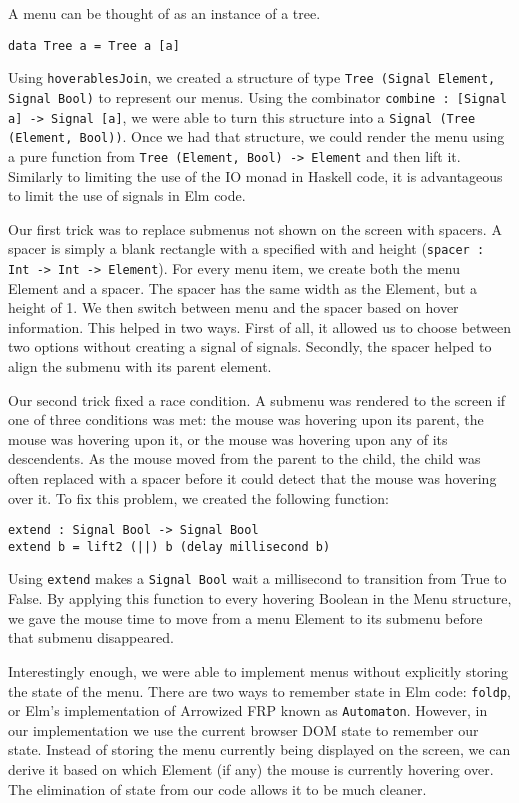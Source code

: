 \documentclass{article}
\begin{document}
A menu can be thought of as an instance of a tree.

\texttt{data Tree a = Tree a [a]}

Using \texttt{hoverablesJoin}, we created a structure of type
\texttt{Tree (Signal Element, Signal Bool)} to represent our menus.
Using the combinator
\texttt{combine : {[}Signal a{]} -\textgreater{} Signal {[}a{]}}, we
were able to turn this structure into a
\texttt{Signal (Tree (Element, Bool))}. Once we had that structure, we
could render the menu using a pure function from
\texttt{Tree (Element, Bool) -\textgreater{} Element} and then lift it.
Similarly to limiting the use of the IO monad in Haskell code, it is
advantageous to limit the use of signals in Elm code.

Our first trick was to replace submenus not shown on the screen with
spacers. A spacer is simply a blank rectangle with a specified with and
height
(\texttt{spacer : Int -\textgreater{} Int -\textgreater{} Element}). For
every menu item, we create both the menu Element and a spacer. The
spacer has the same width as the Element, but a height of 1. We then
switch between menu and the spacer based on hover information. This
helped in two ways. First of all, it allowed us to choose between two
options without creating a signal of signals. Secondly, the spacer
helped to align the submenu with its parent element.

Our second trick fixed a race condition. A submenu was rendered to the
screen if one of three conditions was met: the mouse was hovering upon
its parent, the mouse was hovering upon it, or the mouse was hovering
upon any of its descendents. As the mouse moved from the parent to the
child, the child was often replaced with a spacer before it could detect
that the mouse was hovering over it. To fix this problem, we created the
following function:

\begin{verbatim}
extend : Signal Bool -> Signal Bool
extend b = lift2 (||) b (delay millisecond b)
\end{verbatim}

Using \texttt{extend} makes a \texttt{Signal Bool} wait a millisecond to
transition from True to False. By applying this function to every
hovering Boolean in the Menu structure, we gave the mouse time to move
from a menu Element to its submenu before that submenu disappeared.

Interestingly enough, we were able to implement menus without explicitly
storing the state of the menu. There are two ways to remember state in
Elm code: \texttt{foldp}, or Elm's implementation of Arrowized FRP known
as \texttt{Automaton}. However, in our implementation we use the current
browser DOM state to remember our state. Instead of storing the menu
currently being displayed on the screen, we can derive it based on which
Element (if any) the mouse is currently hovering over. The elimination
of state from our code allows it to be much cleaner.
\end{document}
